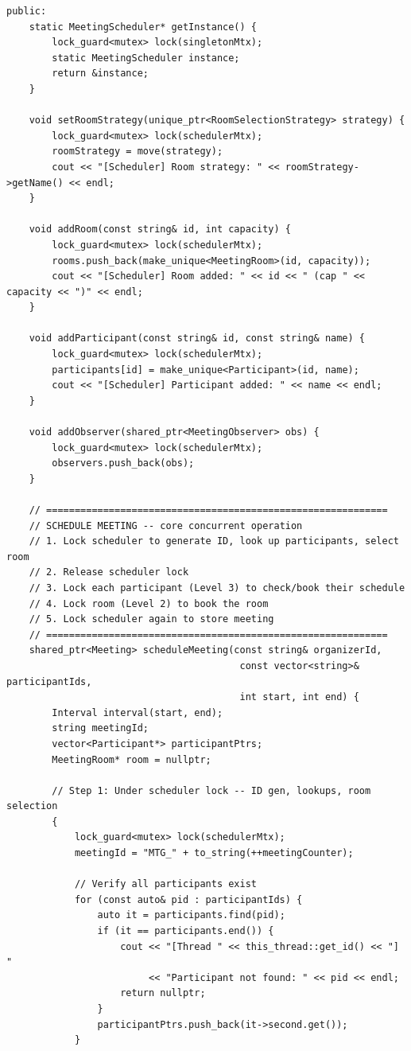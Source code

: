 \documentclass[11pt,a4paper]{article}
\begin{document}
\begin{lstlisting}[title={\texttt{managers.hpp}}]
public:
    static MeetingScheduler* getInstance() {
        lock_guard<mutex> lock(singletonMtx);
        static MeetingScheduler instance;
        return &instance;
    }

    void setRoomStrategy(unique_ptr<RoomSelectionStrategy> strategy) {
        lock_guard<mutex> lock(schedulerMtx);
        roomStrategy = move(strategy);
        cout << "[Scheduler] Room strategy: " << roomStrategy->getName() << endl;
    }

    void addRoom(const string& id, int capacity) {
        lock_guard<mutex> lock(schedulerMtx);
        rooms.push_back(make_unique<MeetingRoom>(id, capacity));
        cout << "[Scheduler] Room added: " << id << " (cap " << capacity << ")" << endl;
    }

    void addParticipant(const string& id, const string& name) {
        lock_guard<mutex> lock(schedulerMtx);
        participants[id] = make_unique<Participant>(id, name);
        cout << "[Scheduler] Participant added: " << name << endl;
    }

    void addObserver(shared_ptr<MeetingObserver> obs) {
        lock_guard<mutex> lock(schedulerMtx);
        observers.push_back(obs);
    }

    // ============================================================
    // SCHEDULE MEETING -- core concurrent operation
    // 1. Lock scheduler to generate ID, look up participants, select room
    // 2. Release scheduler lock
    // 3. Lock each participant (Level 3) to check/book their schedule
    // 4. Lock room (Level 2) to book the room
    // 5. Lock scheduler again to store meeting
    // ============================================================
    shared_ptr<Meeting> scheduleMeeting(const string& organizerId,
                                         const vector<string>& participantIds,
                                         int start, int end) {
        Interval interval(start, end);
        string meetingId;
        vector<Participant*> participantPtrs;
        MeetingRoom* room = nullptr;

        // Step 1: Under scheduler lock -- ID gen, lookups, room selection
        {
            lock_guard<mutex> lock(schedulerMtx);
            meetingId = "MTG_" + to_string(++meetingCounter);

            // Verify all participants exist
            for (const auto& pid : participantIds) {
                auto it = participants.find(pid);
                if (it == participants.end()) {
                    cout << "[Thread " << this_thread::get_id() << "] "
                         << "Participant not found: " << pid << endl;
                    return nullptr;
                }
                participantPtrs.push_back(it->second.get());
            }


\end{lstlisting}
\end{document}
